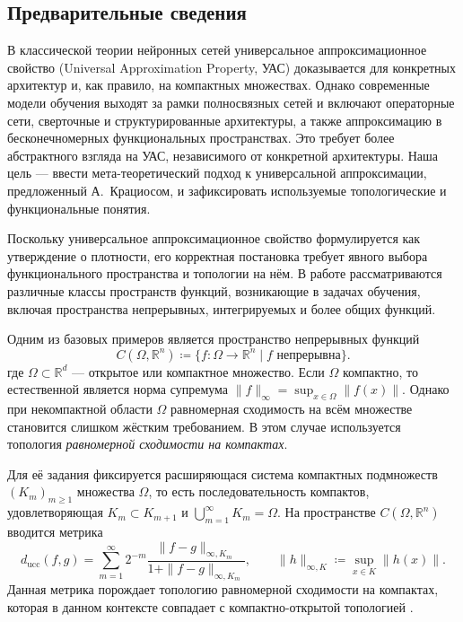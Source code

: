 \documentclass[../NDCNNAI_main.tex]{subfiles}
\begin{document}
\subsection{Предварительные сведения}
В классической теории нейронных сетей универсальное аппроксимационное свойство
(Universal Approximation Property, УАС) доказывается для конкретных архитектур
и, как правило, на компактных множествах. Однако современные модели обучения
выходят за рамки полносвязных сетей и включают операторные сети, сверточные и
структурированные архитектуры, а также аппроксимацию в бесконечномерных
функциональных пространствах. Это требует более абстрактного взгляда на УАС,
независимого от конкретной архитектуры. Наша цель --- ввести
мета-теоретический подход к универсальной аппроксимации, предложенный
А.~Крациосом, и зафиксировать используемые топологические и функциональные
понятия.

Поскольку универсальное аппроксимационное свойство формулируется как утверждение
о плотности, его корректная постановка требует явного выбора функционального
пространства и топологии на нём. В работе \cite{Kratsios2021} рассматриваются
различные классы пространств функций, возникающие в задачах обучения, включая
пространства непрерывных, интегрируемых и более общих функций.

Одним из базовых примеров является пространство непрерывных функций
\[
C(\Omega,\mathbb{R}^n) \coloneq \{ f \colon \Omega \to \mathbb{R}^n \mid f \text{ непрерывна} \}.
\]
где $\Omega \subset \mathbb{R}^d$ --- открытое или компактное множество.
Если $\Omega$ компактно, то естественной является норма супремума
$\|f\|_\infty = \sup_{x\in\Omega}\|f(x)\|$.
Однако при некомпактной области $\Omega$ равномерная сходимость на всём множестве
становится слишком жёстким требованием. В этом случае используется топология
\emph{равномерной сходимости на компактах}.

Для её задания фиксируется расширяющася система компактных подмножеств 
$(K_m)_{m\ge1}$ множества $\Omega$, то есть последовательность компактов,
удовлетворяющая $K_m \subset K_{m+1}$ и $\bigcup_{m=1}^\infty K_m = \Omega$.
На пространстве $C(\Omega,\mathbb{R}^n)$ вводится метрика
\[
d_{\mathrm{ucc}}(f,g)
=
\sum_{m=1}^{\infty}
2^{-m}
\frac{\|f-g\|_{\infty,K_m}}{1+\|f-g\|_{\infty,K_m}},
\qquad
\|h\|_{\infty,K} \coloneq \sup_{x\in K}\|h(x)\|.
\]
Данная метрика порождает топологию равномерной сходимости на компактах, которая
в данном контексте совпадает с компактно-открытой топологией
\cite[Example~1, Section~2.1]{Kratsios2021}.
\end{document}
